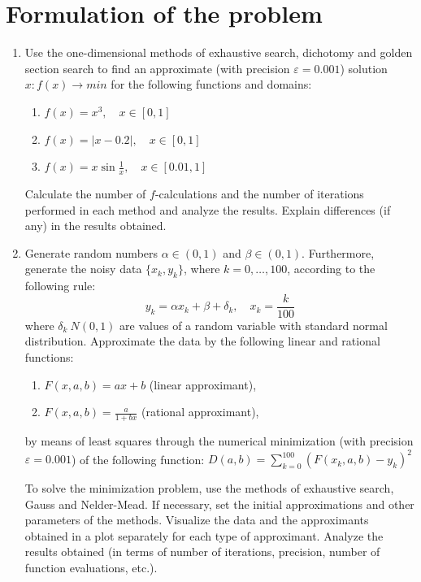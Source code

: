 \documentclass[a4paper,article,14pt]{extarticle}
\begin{document}
	\section{Formulation of the problem}
	\begin{enumerate}[label=(\Roman*)]
		\item\label{I} 
		Use the one-dimensional methods of exhaustive search, dichotomy and golden section search to find an approximate (with precision $\varepsilon = 0.001$) solution $x: f(x)\rightarrow min$ for the following functions and domains:
		\begin{enumerate}[label=(\arabic*)]
		    \item $f(x) = x^3,\quad x \in [0,1]$
		    \item $f(x) = |x - 0.2 |,\quad x \in [0,1]$
		    \item $f(x) = x\sin{\frac{1}{x}},\quad x \in [0.01,1]$
		\end{enumerate}
		Calculate the number of $f$-calculations and the number of iterations performed in each method and analyze the results. Explain differences (if any) in the results obtained.
		\item\label{II} 
		Generate random numbers $\alpha \in (0,1)$ and $\beta \in (0,1)$. Furthermore, generate the noisy data $\{x_k,y_k\}$, where $k = 0, \dotso, 100$, according to the following rule:
		$$y_k = \alpha x_k + \beta + \delta_k, \quad x_k = \frac{k}{100}$$
		where $\delta_k\: N(0,1)$ are values of a random variable with standard normal distribution. Approximate the data by the following linear and rational functions:
		\begin{enumerate}[label=(\arabic*)]
		    \item $F(x,a,b) = ax + b$ \quad (linear approximant),
		    \item $F(x,a,b) = \frac{a}{1+bx}$ \quad (rational approximant),
		\end{enumerate}
		by means of least squares through the numerical minimization (with precision $\varepsilon = 0.001$) of the following function: $D(a,b) = \sum\limits_{k=0}^{100} (F(x_k,a,b)-y_k)^2$
		
		To solve the minimization problem, use the methods of exhaustive search, Gauss and Nelder-Mead. If necessary, set the initial approximations and other parameters of the methods. Visualize the data and the approximants obtained in a plot separately for each type of approximant. Analyze the results obtained (in terms of number of iterations, precision, number of function evaluations, etc.).
	\end{enumerate}
	
\end{document}
